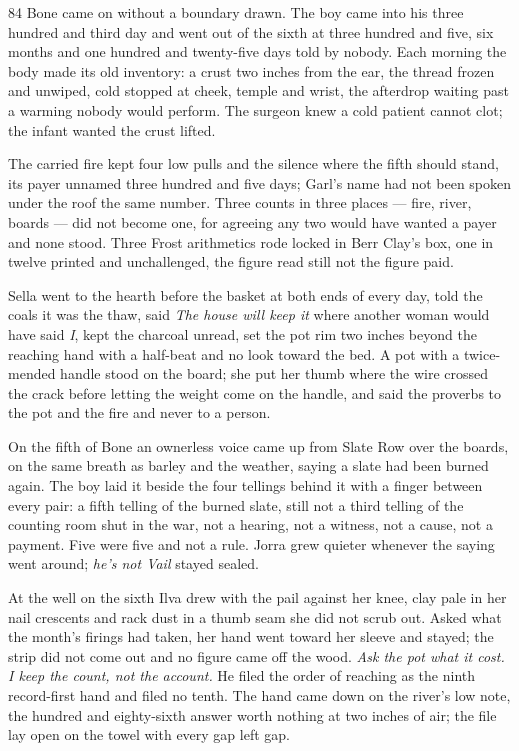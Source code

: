 \begin{CRchronicle}{84}
Bone came on without a boundary drawn. The boy came into his three hundred and third day and went out of the sixth at three hundred and five, six months and one hundred and twenty-five days told by nobody. Each morning the body made its old inventory: a crust two inches from the ear, the thread frozen and unwiped, cold stopped at cheek, temple and wrist, the afterdrop waiting past a warming nobody would perform. The surgeon knew a cold patient cannot clot; the infant wanted the crust lifted.

The carried fire kept four low pulls and the silence where the fifth should stand, its payer unnamed three hundred and five days; Garl’s name had not been spoken under the roof the same number. Three counts in three places --- fire, river, boards --- did not become one, for agreeing any two would have wanted a payer and none stood. Three Frost arithmetics rode locked in Berr Clay’s box, one in twelve printed and unchallenged, the figure read still not the figure paid.

Sella went to the hearth before the basket at both ends of every day, told the coals it was the thaw, said \emph{The house will keep it} where another woman would have said \emph{I}, kept the charcoal unread, set the pot rim two inches beyond the reaching hand with a half-beat and no look toward the bed. A pot with a twice-mended handle stood on the board; she put her thumb where the wire crossed the crack before letting the weight come on the handle, and said the proverbs to the pot and the fire and never to a person.

On the fifth of Bone an ownerless voice came up from Slate Row over the boards, on the same breath as barley and the weather, saying a slate had been burned again. The boy laid it beside the four tellings behind it with a finger between every pair: a fifth telling of the burned slate, still not a third telling of the counting room shut in the war, not a hearing, not a witness, not a cause, not a payment. Five were five and not a rule. Jorra grew quieter whenever the saying went around; \emph{he’s not Vail} stayed sealed.

At the well on the sixth Ilva drew with the pail against her knee, clay pale in her nail crescents and rack dust in a thumb seam she did not scrub out. Asked what the month’s firings had taken, her hand went toward her sleeve and stayed; the strip did not come out and no figure came off the wood. \emph{Ask the pot what it cost. I keep the count, not the account.} He filed the order of reaching as the ninth record-first hand and filed no tenth. The hand came down on the river’s low note, the hundred and eighty-sixth answer worth nothing at two inches of air; the file lay open on the towel with every gap left gap.
\end{CRchronicle}
